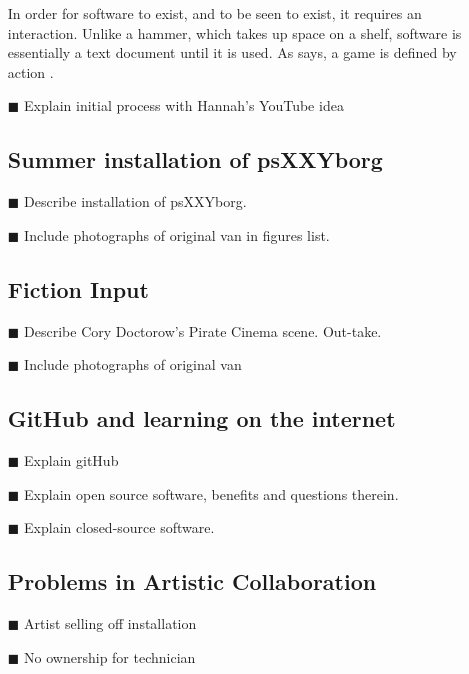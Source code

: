 \begin{itemize}
In order for software to exist, and to be seen to exist, it requires an interaction. Unlike a hammer, which takes up space on a shelf, software is essentially a text document until it is used. As \citeauthor{galloway}says, a game is defined by action \citeyear{galloway}. \cite{galloway}


\item[\tiny{$\blacksquare$}] Explain initial process with Hannah's YouTube idea

\subsection{Summer installation of psXXYborg}
\item[\tiny{$\blacksquare$}] Describe installation of psXXYborg.
\item[\tiny{$\blacksquare$}] Include photographs of original van in figures list.

\subsection{Fiction Input}
\item[\tiny{$\blacksquare$}] Describe Cory Doctorow's Pirate Cinema scene. Out-take.
\item[\tiny{$\blacksquare$}] Include photographs of original van

\subsection{GitHub and learning on the internet}
\item[\tiny{$\blacksquare$}] Explain gitHub
\item[\tiny{$\blacksquare$}] Explain open source software, benefits and questions therein.
\item[\tiny{$\blacksquare$}] Explain closed-source software.

\subsection{Problems in Artistic Collaboration}
\item[\tiny{$\blacksquare$}] Artist selling off installation
\item[\tiny{$\blacksquare$}] No ownership for technician
\end{itemize}